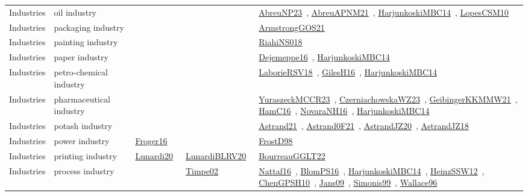 {\begin{longtable}{lp{3cm}>{\raggedright\arraybackslash}p{6cm}>{\raggedright\arraybackslash}p{6cm}>{\raggedright\arraybackslash}p{8cm}}
Industries & oil industry &  &  & \href{../works/AbreuNP23.pdf}{AbreuNP23}~\cite{AbreuNP23}, \href{../works/AbreuAPNM21.pdf}{AbreuAPNM21}~\cite{AbreuAPNM21}, \href{../works/HarjunkoskiMBC14.pdf}{HarjunkoskiMBC14}~\cite{HarjunkoskiMBC14}, \href{../works/LopesCSM10.pdf}{LopesCSM10}~\cite{LopesCSM10}\\
Industries & packaging industry &  &  & \href{../works/ArmstrongGOS21.pdf}{ArmstrongGOS21}~\cite{ArmstrongGOS21}\\
Industries & painting industry &  &  & \href{../works/RiahiNS018.pdf}{RiahiNS018}~\cite{RiahiNS018}\\
Industries & paper industry &  &  & \href{../works/Dejemeppe16.pdf}{Dejemeppe16}~\cite{Dejemeppe16}, \href{../works/HarjunkoskiMBC14.pdf}{HarjunkoskiMBC14}~\cite{HarjunkoskiMBC14}\\
Industries & petro-chemical industry &  &  & \href{../works/LaborieRSV18.pdf}{LaborieRSV18}~\cite{LaborieRSV18}, \href{../works/GilesH16.pdf}{GilesH16}~\cite{GilesH16}, \href{../works/HarjunkoskiMBC14.pdf}{HarjunkoskiMBC14}~\cite{HarjunkoskiMBC14}\\
Industries & pharmaceutical industry &  &  & \href{../works/YuraszeckMCCR23.pdf}{YuraszeckMCCR23}~\cite{YuraszeckMCCR23}, \href{../works/CzerniachowskaWZ23.pdf}{CzerniachowskaWZ23}~\cite{CzerniachowskaWZ23}, \href{../works/GeibingerKKMMW21.pdf}{GeibingerKKMMW21}~\cite{GeibingerKKMMW21}, \href{../works/HamC16.pdf}{HamC16}~\cite{HamC16}, \href{../works/NovaraNH16.pdf}{NovaraNH16}~\cite{NovaraNH16}, \href{../works/HarjunkoskiMBC14.pdf}{HarjunkoskiMBC14}~\cite{HarjunkoskiMBC14}\\
Industries & potash industry &  &  & \href{../works/Astrand21.pdf}{Astrand21}~\cite{Astrand21}, \href{../works/Astrand0F21.pdf}{Astrand0F21}~\cite{Astrand0F21}, \href{../works/AstrandJZ20.pdf}{AstrandJZ20}~\cite{AstrandJZ20}, \href{../works/AstrandJZ18.pdf}{AstrandJZ18}~\cite{AstrandJZ18}\\
Industries & power industry & \href{../works/Froger16.pdf}{Froger16}~\cite{Froger16} &  & \href{../works/FrostD98.pdf}{FrostD98}~\cite{FrostD98}\\
Industries & printing industry & \href{../works/Lunardi20.pdf}{Lunardi20}~\cite{Lunardi20} & \href{../works/LunardiBLRV20.pdf}{LunardiBLRV20}~\cite{LunardiBLRV20} & \href{../works/BourreauGGLT22.pdf}{BourreauGGLT22}~\cite{BourreauGGLT22}\\
Industries & process industry &  & \href{../works/Timpe02.pdf}{Timpe02}~\cite{Timpe02} & \href{../works/Nattaf16.pdf}{Nattaf16}~\cite{Nattaf16}, \href{../works/BlomPS16.pdf}{BlomPS16}~\cite{BlomPS16}, \href{../works/HarjunkoskiMBC14.pdf}{HarjunkoskiMBC14}~\cite{HarjunkoskiMBC14}, \href{../works/HeinzSSW12.pdf}{HeinzSSW12}~\cite{HeinzSSW12}, \href{../works/ChenGPSH10.pdf}{ChenGPSH10}~\cite{ChenGPSH10}, \href{../works/Jans09.pdf}{Jans09}~\cite{Jans09}, \href{../works/Simonis99.pdf}{Simonis99}~\cite{Simonis99}, \href{../works/Wallace96.pdf}{Wallace96}~\cite{Wallace96}\\

\end{longtable}}
